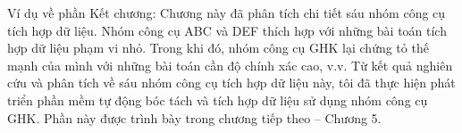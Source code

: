 \documentclass[../DoAn.tex]{subfiles}
\begin{document}
Ví dụ về phần Kết chương: Chương này đã phân tích chi tiết sáu nhóm công cụ tích hợp dữ liệu. Nhóm công cụ ABC và DEF thích hợp với những bài toán tích hợp dữ liệu phạm vi nhỏ. Trong khi đó, nhóm công cụ GHK lại chứng tỏ thế mạnh của mình với những bài toán cần độ chính xác cao, v.v. Từ kết quả nghiên cứu và phân tích về sáu nhóm công cụ tích hợp dữ liệu này, tôi đã thực hiện phát triển phần mềm tự động bóc tách và tích hợp dữ liệu sử dụng nhóm công cụ GHK. Phần này được trình bày trong chương tiếp theo – Chương 5.
\end{document}
